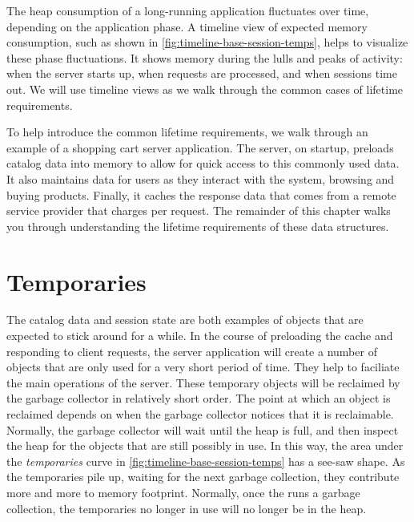 The heap consumption of a long-running application fluctuates over time,
depending on the application phase. A timeline view of expected memory
consumption, such as shown in \autoref{fig:timeline-base-session-temps}, 
helps to visualize these phase fluctuations. It shows memory during the lulls
and peaks of activity: when the server starts up, when requests are processed,
and when sessions time out. We will use
timeline views as we walk through the common cases of
lifetime requirements.


To help introduce the common lifetime requirements, we walk through an example of
a shopping cart server application. The server, on startup, preloads catalog data
into memory to allow for quick access to this commonly used data. It also
maintains data for users as they interact with the system, browsing and buying
products. Finally, it caches the response data that comes from a remote service
provider that charges per request. The remainder of this chapter walks you
through understanding the lifetime requirements of these data structures.

\section{Temporaries}
\label{sec:temporary-lifetime}

The catalog data and session state are both examples of objects that are expected
to stick around for a while. In the course of preloading the cache and responding
to client requests, the server application will create a number of objects that
are only used for a very short period of time.
They help to faciliate the main
operations of the server. These temporary objects will be reclaimed by the \jre
garbage collector in relatively short order. The point at which an object is
reclaimed depends on when the garbage collector notices that it is reclaimable.
Normally, the garbage collector will wait until the heap is full, and then
inspect the heap for the objects that are still possibly in use. In this way, the
area under the \emph{temporaries} curve in
\autoref{fig:timeline-base-session-temps} has a see-saw shape. As the
temporaries pile up, waiting for the next garbage collection, 
they contribute more and more to memory footprint. Normally, once the \jre runs a garbage collection, the
temporaries no longer in use will no longer be in the heap.

